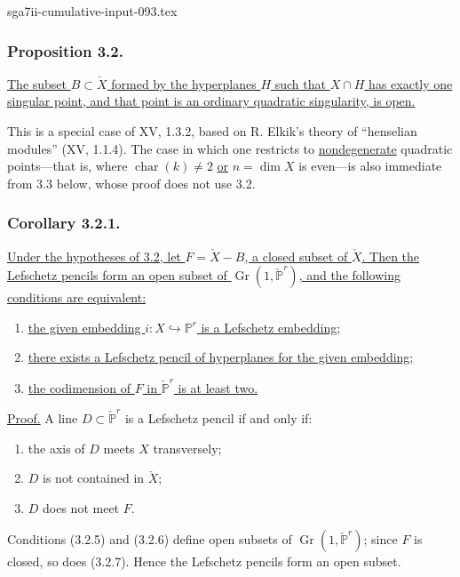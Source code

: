 \begin{filecontents*}{sga7ii-cumulative-input-093.tex}
\subsubsection*{Proposition 3.2.}
\underline{The subset $B\subset\check X$ formed by the hyperplanes
$H$ such that $X\cap H$ has exactly one singular point, and that point
is an ordinary quadratic singularity, is open.}

This is a special case of XV, 1.3.2, based on R. Elkik's theory of
``henselian modules'' (XV, 1.1.4).  The case in which one restricts to
\underline{nondegenerate} quadratic points---that is, where
$\operatorname{char}(k)\ne2$ \underline{or} $n=\dim X$ is even---is
also immediate from 3.3 below, whose proof does not use 3.2.

\subsubsection*{Corollary 3.2.1.}
\underline{Under the hypotheses of 3.2, let $F=\check X-B$, a closed
subset of $\check X$.  Then the Lefschetz pencils form an open subset
of $\operatorname{Gr}(1,\check{\mathbb P}^{r})$, and the following
conditions are equivalent:}
\begin{enumerate}
\item[3.2.2.] \underline{the given embedding
$i:X\hookrightarrow\mathbb P^r$ is a Lefschetz embedding;}
\item[3.2.3.] \underline{there exists a Lefschetz pencil of
hyperplanes for the given embedding;}
\item[3.2.4.] \underline{the codimension of $F$ in
$\check{\mathbb P}^{r}$ is at least two.}
\end{enumerate}

\noindent\underline{Proof.}
A line $D\subset\check{\mathbb P}^{r}$ is a Lefschetz pencil if and
only if:
\begin{enumerate}
\item[(3.2.5)] the axis of $D$ meets $X$ transversely;
\item[(3.2.6)] $D$ is not contained in $\check X$;
\item[(3.2.7)] $D$ does not meet $F$.
\end{enumerate}
Conditions (3.2.5) and (3.2.6) define open subsets of
$\operatorname{Gr}(1,\check{\mathbb P}^{r})$; since $F$ is closed, so
does (3.2.7).  Hence the Lefschetz pencils form an open subset.


\end{filecontents*}

